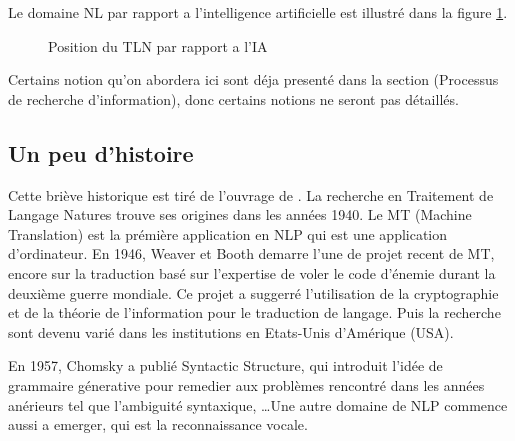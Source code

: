Le domaine NL par rapport a l'intelligence artificielle est illustré dans la figure \ref{nlp-ref-ai}.

\begin{figure}[htbp]
    \begin{center}
        \caption{Position du TLN par rapport a l'IA \citep{devopedia-nlp}}
    \end{center}
    \label{nlp-ref-ai}
\end{figure}

Certains notion qu'on abordera ici sont déja presenté dans la section (Processus de recherche d'information), donc certains notions ne seront pas détaillés.

\subsection{Un peu d'histoire}
Cette briève historique est tiré de l'ouvrage de \citeauthor{natural-language-processing} \citep{natural-language-processing}. La recherche en Traitement de Langage Natures trouve ses origines dans les années 1940. Le MT (Machine Translation) est la prémière application en NLP qui est une application d'ordinateur. En 1946, Weaver et Booth demarre l'une de projet recent de MT, encore sur la traduction basé sur l'expertise de voler le code d'énemie durant la deuxième guerre mondiale. Ce projet a suggerré l'utilisation de la cryptographie et de la théorie de l'information pour le traduction de langage. Puis la recherche sont devenu varié dans les institutions en Etats-Unis d'Amérique (USA).

En 1957, Chomsky a publié Syntactic Structure, qui introduit l'idée de grammaire génerative pour remedier aux problèmes rencontré dans les années anérieurs tel que l'ambiguité syntaxique, \dots Une autre domaine de NLP commence aussi a emerger, qui est la reconnaissance vocale.


